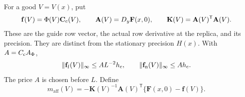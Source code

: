 \documentclass[11pt,reqno]{amsart}
\numberwithin{equation}{section}
\theoremstyle{definition}
\theoremstyle{remark}
\begin{document}
For a good \(V=V(x)\), put
\[
 \mathbf f(V)=\Phi(V)\mathbf C_{\rm c}(V),\qquad
 \mathbf A(V)=D_y\mathbf F(x,0),\qquad
 \mathbf K(V)=\mathbf A(V)^{\mathsf T}\mathbf A(V).
\]
These are the guide row vector, the actual row derivative at the
replica, and its precision. They are distinct from the stationary
precision \(H(x)\). With \(A=C_{\rm c}A_\Phi\),
\begin{equation}
 \|\mathbf f_{\rm f}(V)\|_\infty\le AL^{-2}h_{\rm c},
 \qquad \|\mathbf f_{\rm n}(V)\|_\infty\le Ah_{\rm c}.
 \label{eq:general-central-guide-prices}
\end{equation}
The price \(A\) is chosen before \(L\).
Define
\begin{equation}
 m_{\mathrm{aff}}(V)=-\mathbf K(V)^{-1}\mathbf A(V)^{\mathsf T}
                               \{\mathbf F(x,0)-\mathbf f(V)\}.
 \label{eq:general-central-affine-centre}
\end{equation}
\end{document}
